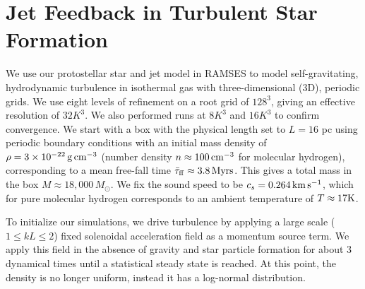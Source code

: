 \documentclass[../dissertation.tex]{subfiles}
\begin{document}
\section{Jet Feedback in Turbulent Star Formation}\label{sec:jet_turbulent star formation}

We use our protostellar star and jet model in RAMSES \citep{2002A&A...385..337T} to model self-gravitating, hydrodynamic turbulence in isothermal gas with three-dimensional (3D), periodic grids.
We use eight levels of refinement on a root grid of $128^3$, giving an effective resolution of $32K^3$.
We also performed runs at $8K^3$ and $16K^3$ to confirm convergence.
We start with a box with the physical length set to $L = 16$ pc using periodic boundary conditions with an initial mass density of $\rho = 3\times10^{-22}\,{\rm g\,cm}^{-3}$ (number density $n \approx 100\,{\rm cm}^{-3}$ for molecular hydrogen), corresponding to a mean free-fall time $\bar\tau_{\rm ff}\approx3.8\,{\rm Myrs}$.
This gives a total mass in the box $M\approx 18,000\,M_\odot$.
We fix the sound speed to be $c_s = 0.264\,{\rm km\,s^{-1}}$, which for pure molecular hydrogen corresponds to an ambient temperature of $T \approx 17 {\rm K}$.

To initialize our simulations, we drive turbulence by applying a large scale
($1 \le kL \le 2$) fixed solenoidal acceleration field as a momentum
source term. %
We apply this field in the absence of gravity and star particle formation for about 3 dynamical times until a statistical steady state is reached.
At this point, the density is no longer uniform, instead it has a log-normal distribution.
\end{document}
